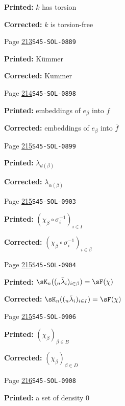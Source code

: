 \begin{description}
\par\noindent\textbf{Printed:} $k$ has torsion
\par\noindent\textbf{Corrected:} $k$ is torsion-free
\smallskip
\item[\hypertarget{apparatus:EN-0154}{154}] Page \hyperlink{printpage:en:213}{213}\quad\texttt{S45-SOL-0889}
\par\noindent\textbf{Printed:} K\"ummer
\par\noindent\textbf{Corrected:} Kummer
\smallskip
\item[\hypertarget{apparatus:EN-0155}{155}] Page \hyperlink{printpage:en:214}{214}\quad\texttt{S45-SOL-0898}
\par\noindent\textbf{Printed:} embeddings of $e_\beta$ into $f$
\par\noindent\textbf{Corrected:} embeddings of $e_\beta$ into $\bar f$
\smallskip
\item[\hypertarget{apparatus:EN-0156}{156}] Page \hyperlink{printpage:en:215}{215}\quad\texttt{S45-SOL-0899}
\par\noindent\textbf{Printed:} \(\lambda_{d(\beta)}\)
\par\noindent\textbf{Corrected:} \(\lambda_{\alpha(\beta)}\)
\smallskip
\item[\hypertarget{apparatus:EN-0157}{157}] Page \hyperlink{printpage:en:215}{215}\quad\texttt{S45-SOL-0903}
\par\noindent\textbf{Printed:} \((\chi_\beta\circ \sigma_i^{-1})_{i\in I}\)
\par\noindent\textbf{Corrected:} \((\chi_\beta\circ \sigma_i^{-1})_{i\in\beta}\)
\smallskip
\item[\hypertarget{apparatus:EN-0158}{158}] Page \hyperlink{printpage:en:215}{215}\quad\texttt{S45-SOL-0904}
\par\noindent\textbf{Printed:} \(\sK_n((_n\bar\lambda_i)_{i\in \beta}) = \sF(\chi)\)
\par\noindent\textbf{Corrected:} \(\sK_n((_n\bar\lambda_i)_{i\in I}) = \sF(\chi)\)
\smallskip
\item[\hypertarget{apparatus:EN-0159}{159}] Page \hyperlink{printpage:en:215}{215}\quad\texttt{S45-SOL-0906}
\par\noindent\textbf{Printed:} \((\chi_\beta)_{\beta\in B}\)
\par\noindent\textbf{Corrected:} \((\chi_\beta)_{\beta\in D}\)
\smallskip
\item[\hypertarget{apparatus:EN-0160}{160}] Page \hyperlink{printpage:en:216}{216}\quad\texttt{S45-SOL-0908}
\par\noindent\textbf{Printed:} a set of density $0$

\end{description}
